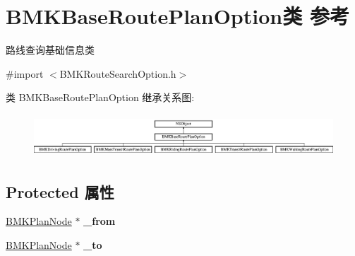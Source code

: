 \hypertarget{interface_b_m_k_base_route_plan_option}{}\section{B\+M\+K\+Base\+Route\+Plan\+Option类 参考}
\label{interface_b_m_k_base_route_plan_option}


路线查询基础信息类  




{\ttfamily \#import $<$B\+M\+K\+Route\+Search\+Option.\+h$>$}

类 B\+M\+K\+Base\+Route\+Plan\+Option 继承关系图\+:\begin{figure}[H]
\begin{center}
\leavevmode
\includegraphics[height=1.607656cm]{interface_b_m_k_base_route_plan_option}
\end{center}
\end{figure}
\subsection*{Protected 属性}
\begin{DoxyCompactItemize}
\item 
\hypertarget{interface_b_m_k_base_route_plan_option_a1a668d22cbdfdf6f4b619522a5c24482}{}\hyperlink{interface_b_m_k_plan_node}{B\+M\+K\+Plan\+Node} $\ast$ {\bfseries \+\_\+from}\label{interface_b_m_k_base_route_plan_option_a1a668d22cbdfdf6f4b619522a5c24482}

\item 
\hypertarget{interface_b_m_k_base_route_plan_option_a57edc8a986cecead42fef9e55949157c}{}\hyperlink{interface_b_m_k_plan_node}{B\+M\+K\+Plan\+Node} $\ast$ {\bfseries \+\_\+to}\label{interface_b_m_k_base_route_plan_option_a57edc8a986cecead42fef9e55949157c}

\end{DoxyCompactItemize}
